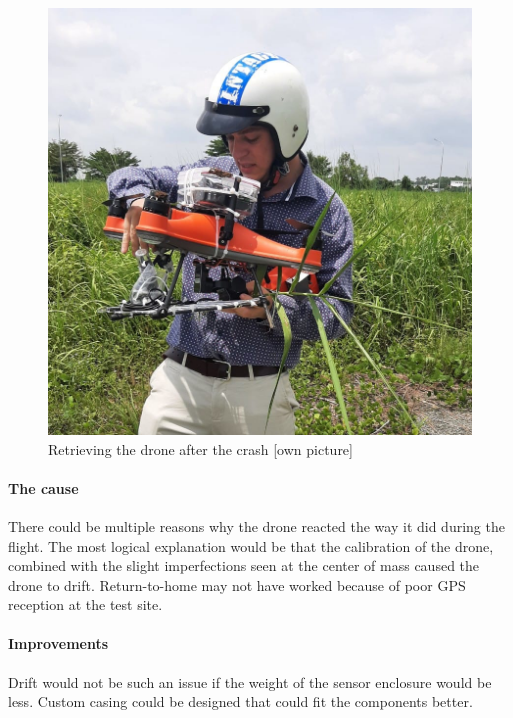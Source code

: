 \begin{figure}[h]
\centering
\includegraphics[scale=1]{080_testing/flights/33_afterflight.jpg}
\caption{Retrieving the drone after the crash [own picture]}
\end{figure}

\paragraph{The cause}
There could be multiple reasons why the drone reacted the way it did during the flight. The most logical explanation would be that the calibration of the drone, combined with the slight imperfections seen at the center of mass caused the drone to drift. Return-to-home may not have worked because of poor \gls{GPS} reception at the test site.

\paragraph{Improvements}
Drift would not be such an issue if the weight of the sensor enclosure would be less. Custom casing could be designed that could fit the components better.